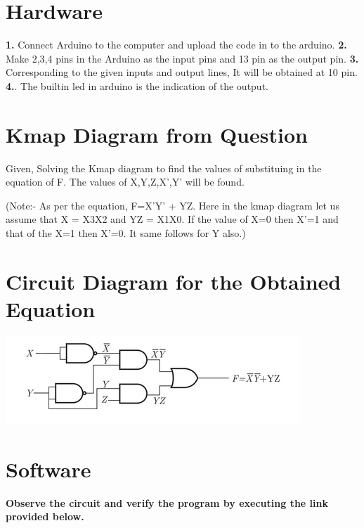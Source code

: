 \documentclass[10pt, a4paper]{article}
\begin{document}
\vspace{5cm}

\section{Hardware}
\textbf{1.} Connect Arduino to the computer and upload the code in to the arduino.
\hfill \break
\hfill \break
\textbf{2.} Make 2,3,4 pins in the Arduino as the input pins and 13 pin as the output pin. 
\hfill \break
\hfill \break
\textbf{3.} Corresponding to the given inputs and output lines, It will be obtained at 10 pin.
\hfill \break
\hfill \break
\textbf{4.}. The builtin led in arduino is the indication of the output.




\section{Kmap Diagram from Question}
Given, Solving the Kmap diagram to find the values of substituing in the equation of F. The values of X,Y,Z,X',Y' will be found.

	\begin{karnaugh-map}[4][2][1][$YZ$][$X$]
	\end{karnaugh-map}	
	
(Note:- As per the equation, F=X'Y' + YZ. Here in the kmap diagram let us assume that X = X3X2 and YZ = X1X0. If the value of X=0 then X'=1 and that of the X=1 then X'=0. It same follows for Y also.)


\section{Circuit Diagram for the Obtained Equation}

\includegraphics{circuit.png}
 
 
\section{Software}
\textbf{Observe the circuit and verify the program by executing the link provided below.}\\
\begin{center}
\end{center}
\end{document}
